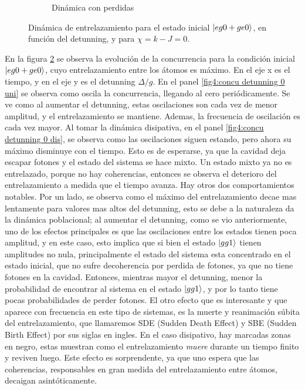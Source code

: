 \begin{figure}[h]
\begin{subfigure}{0.49\textwidth}
        \caption{Dinámica con perdidas}
        \label{fig4:concu k 0 dis}
    \end{subfigure}
    \caption{Dinámica de entrelazamiento para el estado inicial $\ket{eg0+ge0}$, en función del detunning, y para $\chi=k-J=0$.}
    \label{fig4:concu k 0}
\end{figure}
En la figura \ref{fig4:concu k 0} se observa la evolución de la concurrencia para la condición inicial $\ket{eg0+ge0}$, cuyo entrelazamiento entre los átomos es máximo. En el eje x es el tiempo, y en el eje y es el detunning $\Delta/g$. En el panel \ref{fig4:concu detunning 0 uni} se observa como oscila la concurrencia, llegando al cero periódicamente. Se ve como al aumentar el detunning, estas oscilaciones son cada vez de menor amplitud, y el entrelazamiento se mantiene. Ademas, la frecuencia de oscilación es cada vez mayor. Al tomar la dinámica disipativa, en el panel \ref{fig4:concu detunning 0 dis}, se observa como las oscilaciones siguen estando, pero ahora su máximo disminuye con el tiempo. Esto es de esperarse, ya que la cavidad deja escapar fotones y el estado del sistema se hace mixto. Un estado mixto ya no es entrelazado, porque no hay coherencias, entonces se observa el deterioro del entrelazamiento a medida que el tiempo avanza. Hay otros dos comportamientos notables. Por un lado, se observa como el máximo del entrelazamiento decae mas lentamente para valores mas altos del detunning, esto se debe a la naturaleza da la dinámica poblacional; al aumentar el detunning, como se vio anteriormente, uno de los efectos principales es que las oscilaciones entre los estados tienen poca amplitud, y en este caso, esto implica que si bien el estado $\ket{gg1}$ tienen amplitudes no nula, principalmente el estado del sistema esta concentrado en el estado inicial, que no sufre decoherencia por perdida de fotones, ya que no tiene fotones en la cavidad. Entonces, mientras mayor el detunning, menor la probabilidad de encontrar al sistema en el estado $\ket{gg1}$, y por lo tanto tiene pocas probabilidades de perder fotones. El otro efecto que es interesante y que aparece con frecuencia en este tipo de sistemas, es la muerte y reanimación súbita del entrelazamiento, que llamaremos SDE (Sudden Death Effect) y SBE (Sudden Birth Effect) por sus siglas en ingles. En el caso disipativo, hay marcadas zonas en negro, estas muestran como el entrelazamiento \textit{muere} durante un tiempo finito y reviven luego. Este efecto es sorprendente, ya que uno espera que las coherencias, responsables en gran medida del entrelazamiento entre átomos, decaigan asintóticamente. 

